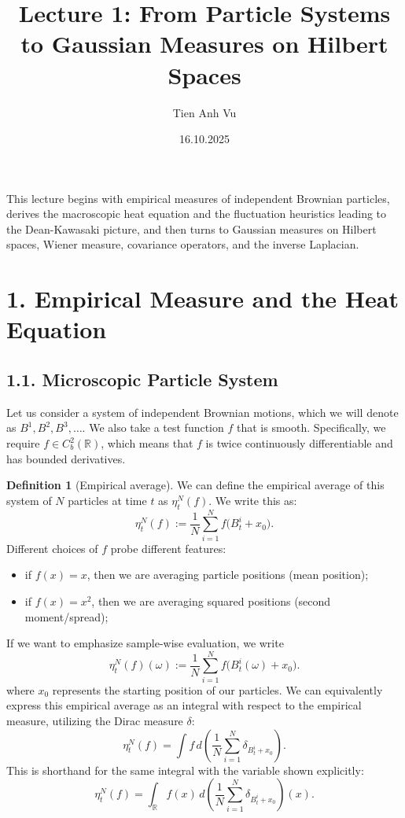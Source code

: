 \documentclass[11pt]{article}
\title{Lecture 1: From Particle Systems to Gaussian Measures on Hilbert Spaces}
\date{16.10.2025}
\author{Tien Anh Vu}
\theoremstyle{definition}
\newtheorem{definition}{Definition}
\theoremstyle{remark}
\begin{document}
\maketitle

This lecture begins with empirical measures of independent Brownian particles, derives the macroscopic heat equation and the fluctuation heuristics leading to the Dean-Kawasaki picture, and then turns to Gaussian measures on Hilbert spaces, Wiener measure, covariance operators, and the inverse Laplacian.

\section*{1. Empirical Measure and the Heat Equation}

\subsection*{1.1. Microscopic Particle System}
Let us consider a system of independent Brownian motions, which we will denote as $B^1, B^2, B^3, \ldots$. We also take a test function $f$ that is smooth. Specifically, we require $f\in C_b^2(\mathbb{R})$, which means that $f$ is twice continuously differentiable and has bounded derivatives.

\begin{definition}[Empirical average]
We can define the empirical average of this system of $N$ particles at time $t$ as $\eta_t^N(f)$. We write this as:
\[
\eta_t^N(f):=\frac{1}{N}\sum_{i=1}^{N} f\bigl(B_t^i+x_0\bigr).
\]
Different choices of $f$ probe different features:
\begin{itemize}
\item if $f(x)=x$, then we are averaging particle positions (mean position);
\item if $f(x)=x^2$, then we are averaging squared positions (second moment/spread);
\end{itemize}
If we want to emphasize sample-wise evaluation, we write
\[
\eta_t^N(f)(\omega):=\frac{1}{N}\sum_{i=1}^{N} f\bigl(B_t^i(\omega)+x_0\bigr).
\]
where $x_0$ represents the starting position of our particles. We can equivalently express this empirical average as an integral with respect to the empirical measure, utilizing the Dirac measure $\delta$:
\[
\eta_t^N(f)=\int f\,d\!\left(\frac{1}{N}\sum_{i=1}^{N}\delta_{B_t^i+x_0}\right).
\]
This is shorthand for the same integral with the variable shown explicitly:
\[
\eta_t^N(f)=\int_{\mathbb R} f(x)\,d\!\left(\frac{1}{N}\sum_{i=1}^{N}\delta_{B_t^i+x_0}\right)(x).
\]
\end{definition}
\end{document}
